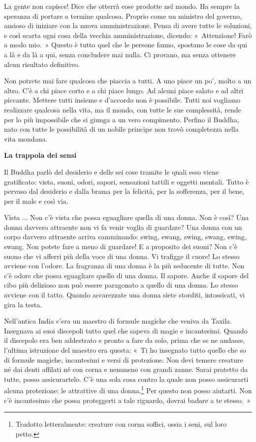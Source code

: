 La gente non capisce! Dice che otterrà cose prodotte nel mondo. Ha
sempre la speranza di portare a termine qualcosa. Proprio come un
ministro del governo, ansioso di iniziare con la nuova amministrazione.
Pensa di avere tutte le soluzioni, e così scarta ogni cosa della vecchia
amministrazione, dicendo: «~Attenzione! Farò a modo mio.~» Questo è
tutto quel che le persone fanno, spostano le cose da qui a là e da là a
qui, senza concludere mai nulla. Ci provano, ma senza ottenere alcun
risultato definitivo.

Non potrete mai fare qualcosa che piaccia a tutti. A uno piace un po',
molto a un altro. C'è a chi piace corto e a chi piace lungo. Ad alcuni
piace salato e ad altri piccante. Mettere tutti insieme e d'accordo non
è possibile. Tutti noi vogliamo realizzare qualcosa nella vita, ma il
mondo, con tutte le sue complessità, rende per lo più impossibile che si
giunga a un vero compimento. Perfino il Buddha, nato con tutte le
possibilità di un nobile principe non trovò completezza nella vita
mondana.

\textbf{La trappola dei sensi}

Il Buddha parlò del desiderio e delle sei cose tramite le quali esso
viene gratificato: vista, suoni, odori, sapori, sensazioni tattili e
oggetti mentali. Tutto è pervaso dal desiderio e dalla brama per la
felicità, per la sofferenza, per il bene, per il male e così via.

Vista ... Non c'è vista che possa eguagliare quella di una donna. Non è
così? Una donna davvero attraente non vi fa venir voglia di guardare?
Una donna con un corpo davvero attraente arriva camminando: swing,
swang, swing, swang, swing, swang. Non potete fare a meno di guardare! E
a proposito dei suoni? Non c'è suono che vi afferri più della voce di
una donna. Vi trafigge il cuore! Lo stesso avviene con l'odore. La
fragranza di una donna è la più seducente di tutte. Non c'è odore che
possa eguagliare quello di una donna. Il sapore. Anche il sapore del
cibo più delizioso non può essere paragonato a quello di una donna. Lo
stesso avviene con il tatto. Quando accarezzate una donna siete
storditi, intossicati, vi gira la testa.

Nell'antica India c'era un maestro di formule magiche che veniva da
Taxila. Insegnava ai suoi discepoli tutto quel che sapeva di magie e
incantesimi. Quando il discepolo era ben addestrato e pronto a fare da
solo, prima che se ne andasse, l'ultima istruzione del maestro era
questa: «~Ti ho insegnato tutto quello che so di formule magiche,
incantesimi e versi di protezione. Non devi temere creature né dai denti
affilati né con corna e nemmeno con grandi zanne. Sarai protetto da
tutte, posso assicurartelo. C'è una sola cosa contro la quale non posso
assicurarti alcuna protezione: le attrattive di una donna.\footnote{Tradotto
  letteralmente: creature con corna soffici, ossia i seni, sul loro
  petto.} Per questo non posso aiutarti. Non c'è incantesimo che possa
proteggerti a tale riguardo, dovrai badare a te stesso.~»

